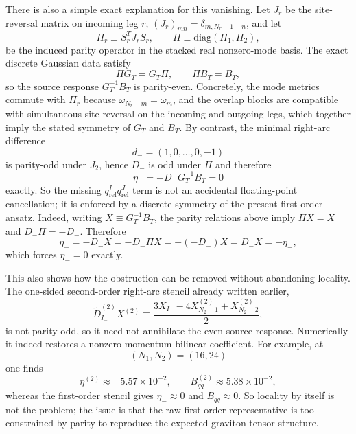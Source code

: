 \documentclass[11pt]{article}
\numberwithin{equation}{section}
\begin{document}
There is also a simple exact explanation for this vanishing. Let $J_r$ be the site-reversal matrix on incoming leg $r$, $(J_r)_{mn}=\delta_{m,N_r-1-n}$, and let
\begin{equation}
\label{eq:s15-1-021}
\Pi_r \equiv S_r^T J_r S_r,
\qquad
\Pi\equiv \mathrm{diag}(\Pi_1,\Pi_2),
\end{equation}
be the induced parity operator in the stacked real nonzero-mode basis. The exact discrete Gaussian data satisfy
\begin{equation}
\label{eq:s15-1-022}
\Pi G_T=G_T\Pi,
\qquad
\Pi B_T=B_T,
\end{equation}
so the source response $G_T^{-1}B_T$ is parity-even. Concretely, the mode metrics commute with $\Pi_r$ because $\omega_{N_r-m}=\omega_m$, and the overlap blocks are compatible with simultaneous site reversal on the incoming and outgoing legs, which together imply the stated symmetry of $G_T$ and $B_T$. By contrast, the minimal right-arc difference
\begin{equation}
\label{eq:s15-1-023}
d_-=(1,0,\dots,0,-1)
\end{equation}
is parity-odd under $J_2$, hence $D_-$ is odd under $\Pi$ and therefore
\begin{equation}
\label{eq:s15-1-024}
\eta_-=-D_-G_T^{-1}B_T=0
\end{equation}
exactly. So the missing $q_{\mathrm{rel}}^Iq_{\mathrm{rel}}^J$ term is not an accidental floating-point cancellation; it is enforced by a discrete symmetry of the present first-order ansatz.
Indeed, writing $X\equiv G_T^{-1}B_T$, the parity relations above imply $\Pi X=X$ and $D_-\Pi=-D_-$. Therefore
\begin{equation}
\label{eq:s15-1-024a}
\eta_-
=
-D_-X
=
-D_-\Pi X
=
-(-D_-)X
=
D_-X
=
-\eta_-,
\end{equation}
which forces $\eta_-=0$ exactly.

This also shows how the obstruction can be removed without abandoning locality. The one-sided second-order right-arc stencil already written earlier,
\begin{equation}
\label{eq:s15-1-025}
\widetilde D^{(2)}_{I_-}X^{(2)}
\equiv
\frac{3X_{I_-}-4X_{N_2-1}^{(2)}+X_{N_2-2}^{(2)}}{2},
\end{equation}
is not parity-odd, so it need not annihilate the even source response. Numerically it indeed restores a nonzero momentum-bilinear coefficient. For example, at
\begin{equation}
\label{eq:s15-1-026}
(N_1,N_2)=(16,24)
\end{equation}
one finds
\begin{equation}
\label{eq:s15-1-027}
\eta_-^{(2)}\approx -5.57\times 10^{-2},
\qquad
B_{qq}^{(2)}\approx 5.38\times 10^{-2},
\end{equation}
whereas the first-order stencil gives $\eta_-\approx 0$ and $B_{qq}\approx 0$. So locality by itself is not the problem; the issue is that the raw first-order representative is too constrained by parity to reproduce the expected graviton tensor structure.
\end{document}
